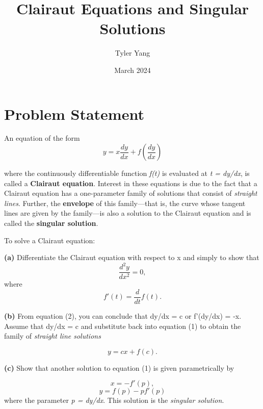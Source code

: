 \documentclass{article}
\title{Clairaut Equations and Singular Solutions}
\author{Tyler Yang}
\date{March 2024}
\begin{document}
\maketitle

\section{Problem Statement}
An equation of the form
\begin{equation}
y = x \frac{dy}{dx} + f(\frac{dy}{dx})
\end{equation}

\noindent where the continuously differentiable function \textit{f(t)} is evaluated at \textit{ t = dy/dx}, is called a \textbf{Clairaut equation}. Interest in these equations is due to the fact that a Clairaut equation has a one-parameter family of solutions that consist of \textit{straight lines}. Further, the \textbf{envelope} of this family---that is, the curve whose tangent lines are given by the family---is also a solution to the Clairaut equation and is called the \textbf{singular solution}.\newline

\noindent To solve a Clairaut equation:\newline

\noindent\textbf{(a)} Differentiate the Clairaut equation with respect to x and simply to show that
\begin{equation}
[x + f'(\frac{dy}{dx})] \frac{d^2y}{dx^2} = 0,
\end{equation}
where 
\begin{equation}
\end{equation}
\textit{\[f'(t) = \frac{d}{dt}f(t).\]}

\noindent\textbf{(b)} From equation (2), you can conclude that dy/dx = c or f'(dy/dx) = -x. Assume that dy/dx = c and substitute back into equation (1) to obtain the family of \textit{straight line solutions}

\begin{equation}
y = cx + f(c).
\end{equation}

\noindent\textbf{(c)} Show that another solution to equation (1) is given parametrically by 

\begin{equation}
x = -f'(p),
\end{equation}
\begin{equation}
y = f(p)  - pf'(p)
\end{equation}
where the parameter \textit{p = dy/dx}. This solution is the \textit{singular solution}.
\end{document}
